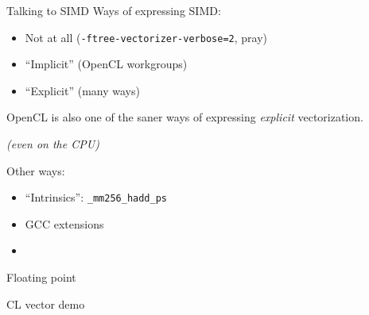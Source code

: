 \documentclass[english,compress]{beamer}
\begin{document}
\begin{frame}{Talking to SIMD}
  Ways of expressing SIMD:
  \begin{itemize}
    \item Not at all (\texttt{-ftree-vectorizer-verbose=2}, pray)
    \item ``Implicit'' (OpenCL workgroups)
    \item ``Explicit'' (many ways)
  \end{itemize}

  \bigskip
  OpenCL is also one of the saner ways of expressing
  \emph{explicit} vectorization.

  \emph{(even on the CPU)}

  \bigskip
  Other ways:
  \begin{itemize}
    \item ``Intrinsics'': \texttt{\_mm256\_hadd\_ps}
    \item GCC extensions
    \item {}
  \end{itemize}
\end{frame}
\begin{frame}{Floating point}
  \begin{center}
  \Huge CL vector demo
  \end{center}
\end{frame}
\end{document}
